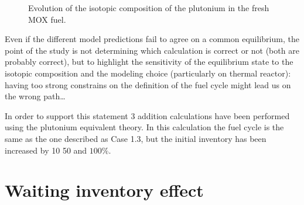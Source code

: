 \documentclass[10pt]{article}
\begin{document}
\begin{figure}[h!]
  \centering
  

  \caption{ Evolution of the isotopic composition of the plutonium in the fresh MOX fuel.
    \label{fig:pu_compo} } 
  \end{figure}

Even if the different model predictions fail to agree on a common equilibrium,
the point of the study is not determining which calculation is correct or not
(both are probably correct), but to highlight the sensitivity of the equilibrium
state to the isotopic composition and the modeling choice (particularly on
thermal reactor): having too strong constrains on the definition of the fuel
cycle might lead us on the wrong path\dots


In order to support this statement 3 addition calculations have been performed
using the plutonium equivalent theory. In this calculation the fuel cycle is
the same as the one described as Case 1.3, but the initial inventory has been
increased by 10 50 and $100\%$.


\section{Waiting inventory effect}








\end{document}
